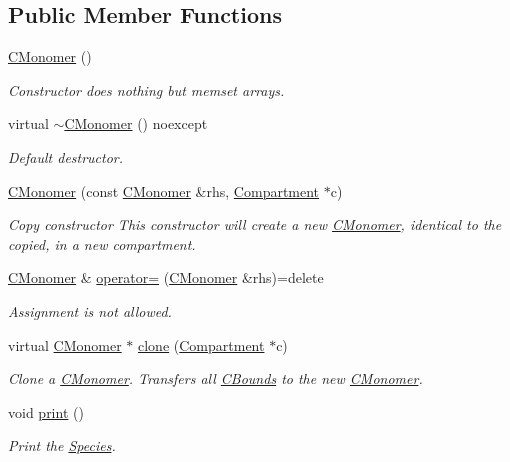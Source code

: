 \subsection*{Public Member Functions}
\begin{DoxyCompactItemize}
\item 
\hyperlink{classCMonomer_a760d83db89ce412da21635983e18241d}{C\+Monomer} ()
\begin{DoxyCompactList}\small\item\em Constructor does nothing but memset arrays. \end{DoxyCompactList}\item 
virtual \hyperlink{classCMonomer_a6cfd5fad73b8f76fc45205839abe11bd}{$\sim$\+C\+Monomer} () noexcept
\begin{DoxyCompactList}\small\item\em Default destructor. \end{DoxyCompactList}\item 
\hyperlink{classCMonomer_aa4592f7871a18ec48697cd8d626d3c7b}{C\+Monomer} (const \hyperlink{classCMonomer}{C\+Monomer} \&rhs, \hyperlink{classCompartment}{Compartment} $\ast$c)
\begin{DoxyCompactList}\small\item\em Copy constructor This constructor will create a new \hyperlink{classCMonomer}{C\+Monomer}, identical to the copied, in a new compartment. \end{DoxyCompactList}\item 
\hyperlink{classCMonomer}{C\+Monomer} \& \hyperlink{classCMonomer_a6145f013c6830c4aded4fb5677f38054}{operator=} (\hyperlink{classCMonomer}{C\+Monomer} \&rhs)=delete
\begin{DoxyCompactList}\small\item\em Assignment is not allowed. \end{DoxyCompactList}\item 
virtual \hyperlink{classCMonomer}{C\+Monomer} $\ast$ \hyperlink{classCMonomer_adbb775dba38bc68856db9529826f9676}{clone} (\hyperlink{classCompartment}{Compartment} $\ast$c)
\begin{DoxyCompactList}\small\item\em Clone a \hyperlink{classCMonomer}{C\+Monomer}. Transfers all \hyperlink{classCBound}{C\+Bounds} to the new \hyperlink{classCMonomer}{C\+Monomer}. \end{DoxyCompactList}\item 
void \hyperlink{classCMonomer_a72138cb91d962aed900869f4096afd92}{print} ()
\begin{DoxyCompactList}\small\item\em Print the \hyperlink{classSpecies}{Species}. \end{DoxyCompactList}\end{DoxyCompactItemize}
